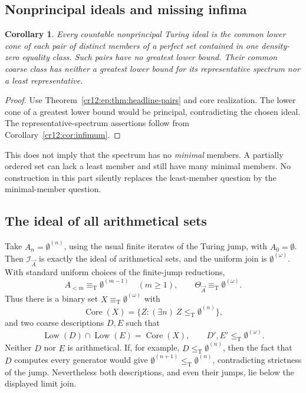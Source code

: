 \documentclass[11pt,letterpaper]{article}
\theoremstyle{plain}
\newtheorem{corollary}[theorem]{Corollary}
\theoremstyle{definition}
\theoremstyle{remark}
\numberwithin{equation}{section}
\newcommand{\leT}{\leq_{\mathrm T}}
\newcommand{\eqT}{\equiv_{\mathrm T}}
\newcommand{\Core}{\operatorname{Core}}
\newcommand{\Low}{\operatorname{Low}}
\newcommand{\I}{\mathcal I}
\newcommand{\Alt}[1]{A_{<#1}}            %
\begin{document}
\subsection{Nonprincipal ideals and missing infima}
\begin{corollary}\label{cr12:ep:cor:nonprincipal}
Every countable nonprincipal Turing ideal is the common lower cone of each pair of
distinct members of a perfect set contained in one density-zero equality class. Such
pairs have no greatest lower bound. Their common coarse class has neither a greatest
lower bound for its representative spectrum nor a least representative.
\end{corollary}
\begin{proof}
Use Theorem~\ref{cr12:ep:thm:headline-pairs} and core realization. The lower cone of a
greatest lower bound would be principal, contradicting the chosen ideal. The
representative-spectrum assertions follow from Corollary~\ref{cr12:cor:infimum}.
\end{proof}

This does not imply that the spectrum has no \emph{minimal} members. A partially
ordered set can lack a least member and still have many minimal members. No
construction in this part silently replaces the least-member question by the
minimal-member question.

\subsection{The ideal of all arithmetical sets}\label{cr12:ep:subsec:arithmetic}
Take $A_n=\emptyset^{(n)}$, using the usual finite iterates of the Turing jump, with
$A_0=\emptyset$. Then $\I_{\vec A}$ is exactly the ideal of arithmetical sets, and the
uniform join is $\emptyset^{(\omega)}$. With standard uniform choices of the
finite-jump reductions,
\[
 \Alt m\eqT\emptyset^{(m-1)}\quad(m\ge1),\qquad
 \Theta_{\vec A}\eqT\emptyset^{(\omega)}.
\]
Thus there is a binary set $X\eqT\emptyset^{(\omega)}$ with
\[
 \Core(X)=\{Z:(\exists n)\ Z\leT\emptyset^{(n)}\},
\]
and two coarse descriptions $D,E$ such that
\begin{equation}\label{cr12:ep:eq:arithmetic-pair}
 \Low(D)\cap\Low(E)=\Core(X),\qquad
 D',E'\leT\emptyset^{(\omega)}.
\end{equation}
Neither $D$ nor $E$ is arithmetical. If, for example, $D\leT\emptyset^{(n)}$, then
the fact that $D$ computes every generator would give
$\emptyset^{(n+1)}\leT\emptyset^{(n)}$, contradicting strictness of the jump.
Nevertheless both descriptions, and even their jumps, lie below the displayed limit
join.
\end{document}
